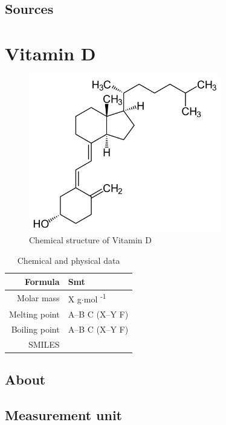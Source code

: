 \documentclass{book}
\begin{document}
\section{Sources}


\chapter{Vitamin D}
\begin{figure}[h]
	\caption{Chemical structure of Vitamin D}
	\centering \includegraphics[width=0.75\textwidth]{images/Vitamin_D_chemical_structure}
\end{figure}

\begin{table}[h]
	\caption{Chemical and physical data}
	\centering \begin{tabular}{| r | l |}
		\hline
		Formula & Smt\\ \hline
		Molar mass & X g$\cdot$mol \textsuperscript{-1}\\ \hline
		Melting point & A--B \degree C (X--Y \degree F)\\ \hline
		Boiling point & A--B \degree C (X--Y \degree F)\\ \hline
		SMILES & \\ \hline
	\end{tabular}
\end{table}
\newpage

\section{About}


\section{Measurement unit}
\end{document}
